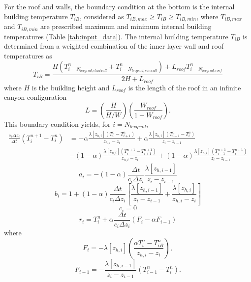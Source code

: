 \documentclass[12pt,authoryear]{elsarticle}
\numberwithin{equation}{section} %
\begin{document}
For the roof and walls, the boundary condition at the bottom is the internal building temperature $T_{iB}$, considered as $T_{iB,max}\geq T_{iB} \geq T_{iB,min}$, where $T_{iB,max}$ and $T_{iB,min}$ are prescribed maximum and minimum internal building temperatures (Table \ref{tab:input_data}). The internal building temperature $T_{iB}$ is determined from a weighted combination of the inner layer wall and roof temperatures as
\begin{equation}
T_{iB} = \frac{H(T_{i=N_{levgrnd,shadwall}}^{n}+T_{i=N_{levgrnd,sunwall}}^{n})+L_{roof}T_{i=N_{levgrnd,roof}}^{n}}{2H+L_{roof}}
\end{equation}
where $H$ is the building height and $L_{roof}$ is the length of the roof in an infinite canyon configuration
\begin{equation}
L=\left(\frac{H}{H/W}\right)\left(\frac{W_{roof}}{1-W_{roof}}\right).
\end{equation}
This boundary condition yields, for $i=N_{levgrnd}$,
\begin{equation}
\begin{aligned}
\frac{c_{i}\Delta z_{i}}{\Delta t}(T_{i}^{n+1} -T_{i}^{n})
&=-\alpha\frac{\lambda[z_{h,i}](T_{i}^{n}-T_{i+1}^{n})}{z_{h,i}-z_{i}}+\alpha\frac{\lambda[z_{h,i}](T_{i-1}^{n}-T_{i}^{n})}{z_{i}-z_{i-1}}\\
&-(1-\alpha)\frac{\lambda[z_{h,i}](T_{i}^{n+1}-T_{i+1}^{n+1})}{z_{h,i}-z_{i}}+(1-\alpha)\frac{\lambda[z_{h,i}](T_{i-1}^{n+1}-T_{i}^{n+1})}{z_{i}-z_{i-1}}
\end{aligned}
\end{equation}
\begin{equation}
a_{i} = -(1-\alpha)\frac{\Delta t}{c_{i}\Delta z_{i}}\frac{\lambda [z_{h,i-1}]}{z_{i}-z_{i-1}}
\end{equation}
\begin{equation}
b_{i} = 1+(1-\alpha)\frac{\Delta t}{c_{i} \Delta z_{i}}\left[\frac{\lambda [z_{h,i-1}]}{z_{i}-z_{i-1}}+\frac{\lambda [z_{h,i}]}{z_{h,i}-z_{i}}\right]
\end{equation}
\begin{equation}
c_{i}=0
\end{equation}
\begin{equation}
r_{i}=T_{i}^{n}+\alpha\frac{\Delta t}{c_{i}\Delta z_{i}}(F_{i}-\alpha F_{i-1})
\end{equation}
where
\begin{equation}
F_{i}=-\lambda[z_{h,i}]\left(\frac{\alpha T_{i}^{n}-T_{iB}^{n}}{z_{h,i}-z_{i}}\right),
\end{equation}
\begin{equation}
F_{i-1} = -\frac{\lambda [z_{h,i-1}]}{z_{i}-z_{i-1}}(T_{i-1}^{n}-T_{i}^{n}).
\end{equation}
\end{document}
